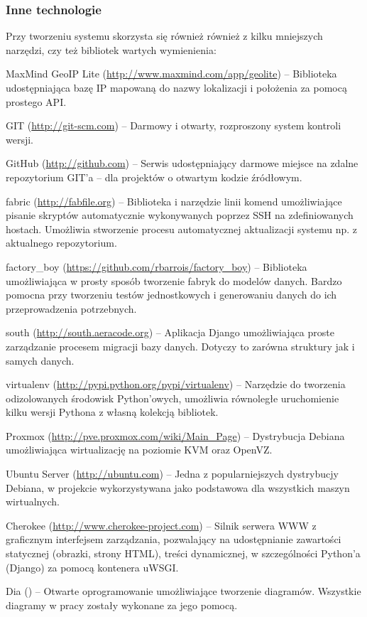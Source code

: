 \begin{minipage}{\textwidth}
    \subsubsection{Inne technologie}
    Przy tworzeniu systemu skorzysta się również również z kilku mniejszych narzędzi, czy też bibliotek wartych wymienienia:
    \begin{packed_item}
        \item{MaxMind GeoIP Lite (\url{http://www.maxmind.com/app/geolite}) -- Biblioteka udostępniająca bazę IP mapowaną do nazwy lokalizacji i położenia za pomocą prostego API.}
        \item{GIT (\url{http://git-scm.com}) -- Darmowy i otwarty, rozproszony system kontroli wersji.}
        \item{GitHub (\url{http://github.com}) -- Serwis udostępniający darmowe miejsce na zdalne repozytorium GIT'a -- dla projektów o otwartym kodzie źródłowym.}
        \item{fabric (\url{http://fabfile.org}) -- Biblioteka i narzędzie linii komend umożliwiające pisanie skryptów automatycznie wykonywanych poprzez SSH na zdefiniowanych hostach. Umożliwia stworzenie procesu automatycznej aktualizacji systemu np. z aktualnego repozytorium.}
        \item{factory\_boy (\url{https://github.com/rbarrois/factory\_boy}) -- Biblioteka umożliwiająca w prosty sposób tworzenie fabryk do modelów danych. Bardzo pomocna przy tworzeniu testów jednostkowych i generowaniu danych do ich przeprowadzenia potrzebnych.}
        \item{south (\url{http://south.aeracode.org}) -- Aplikacja Django umożliwiająca proste zarządzanie procesem migracji bazy danych. Dotyczy to zarówna struktury jak i samych danych.}
        \item{virtualenv (\url{http://pypi.python.org/pypi/virtualenv}) -- Narzędzie do tworzenia odizolowanych środowisk Python'owych, umożliwia równoległe uruchomienie kilku wersji Pythona z własną kolekcją bibliotek.}
        \item{Proxmox (\url{http://pve.proxmox.com/wiki/Main_Page}) -- Dystrybucja Debiana umożliwiająca wirtualizację na poziomie KVM oraz OpenVZ.}
        \item{Ubuntu Server (\url{http://ubuntu.com}) -- Jedna z popularniejszych dystrybucjy Debiana, w projekcie wykorzystywana jako podstawowa dla wszystkich maszyn wirtualnych.}
        \item{Cherokee (\url{http://www.cherokee-project.com}) -- Silnik serwera WWW z graficznym interfejsem zarządzania, pozwalający na udostępnianie zawartości statycznej (obrazki, strony HTML), treści dynamicznej, w szczególności Python'a (Django) za pomocą kontenera uWSGI.}
        \item{Dia (\url{}) -- Otwarte oprogramowanie umożliwiające tworzenie diagramów. Wszystkie diagramy w pracy zostały wykonane za jego pomocą.}
    \end{packed_item}
\end{minipage}

\newpage
